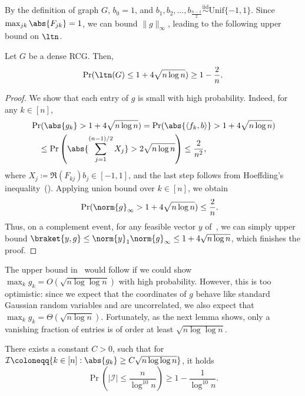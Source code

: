 By the definition of graph \(G\), \(b_0 = 1\), and \(b_1, b_2, \ldots, b_{\frac{n - 1}{2}} \overset{\mathrm{iid}}{\sim} \mathrm{Unif}\{-1, 1\}\).
Since \(\max_{jk} \abs{F_{jk}} = 1\), we can bound \(\|g\|_{\infty}\), leading to the following upper bound on \(\ltn\).
\begin{lemma}
\label{lem:nlogn_ub}
Let \(G\) be a dense RCG. Then,
\begin{equation}
\Pr(\ltn(G) \leq 1 + 4\sqrt{n \log n}) \geq 1 - \frac{2}{n}.
\end{equation}
\end{lemma}
\begin{proof}
We show that each entry of \(g\) is small with high probability. Indeed, for any \(k \in [n]\),
\begin{equation}
\begin{aligned}
&\Pr(\abs{g_k} > 1 + 4 \sqrt{n \log n}) = \Pr(\abs{\langle f_k, b \rangle} > 1 + 4 \sqrt{n \log n}) \\
&\quad \leq \Pr\left(\abs{\sum_{j = 1}^{(n - 1) / 2}X_j} > 2 \sqrt{n \log n}\right) \leq \frac{2}{n^2},
\end{aligned}
\end{equation}
where \(X_j \coloneqq \Re(F_{kj})b_j \in [-1, 1]\), and the last step follows from Hoeffding's inequality~().
Applying union bound over \(k \in [n]\), we obtain
\begin{equation}
\label{eq:linf_norm}
\begin{aligned}
    &\Pr(\norm{g}_{\infty} > 1 + 4 \sqrt{n \log n}) \leq \frac{2}{n}.
\end{aligned}
\end{equation}
Thus, on a complement event, for any feasible vector \(y\) of~, we can simply upper bound \(\braket{y, g} \leq \norm{y}_{1} \norm{g}_{\infty} \leq 1 + 4\sqrt{n \log n}\), which finishes the proof.
\end{proof}

The upper bound in~ would follow if we could show \(\max_k g_k = O(\sqrt{n \log \log n})\) with high probability.
However, this is too optimistic: since we expect that the coordinates of \(g\) behave like standard Gaussian random variables and are uncorrelated, 
we also expect that \(\max_k g_k = \Theta(\sqrt{n \log n})\). 
Fortunately, as the next lemma shows, only a vanishing fraction of entries is of order at least \(\sqrt{n \log \log n}\).
\begin{lemma}
\label{lem:few_large}
There exists a constant \(C > 0\), such that for \(\mathcal{I} \coloneqq \{k \in [n]: \abs{g_k} \geq C \sqrt{n\log \log n}\}\), it holds
    \begin{equation}
        \Pr\left(\lvert \mathcal{I} \rvert \leq \frac{n}{\log^{10} n}\right) \geq 1 - \frac{1}{\log^{10} n}.
    \end{equation}
\end{lemma}

